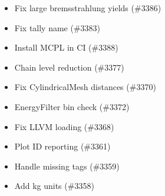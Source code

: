 \begin{itemize}
\item Fix large bremsstrahlung yields (\#3386)
\item Fix tally name (\#3383)
\item Install MCPL in CI (\#3388)
\item Chain level reduction (\#3377)
\item Fix CylindricalMesh distances (\#3370)
\item EnergyFilter bin check (\#3372)
\item Fix LLVM loading (\#3368)
\item Plot ID reporting (\#3361)
\item Handle missing tags (\#3359)
\item Add kg units (\#3358)
\end{itemize}